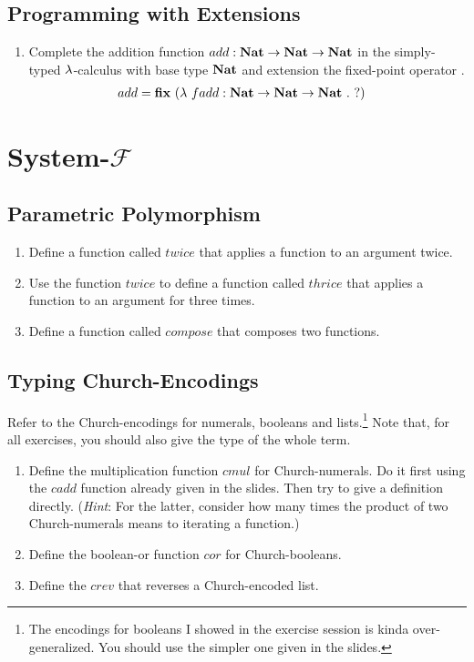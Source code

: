 \documentclass[a4paper,12pt]{article}
\begin{document}
\subsection{Programming with Extensions}

\begin{enumerate}
 \item Complete the addition function $add : \textbf{Nat} \rightarrow \textbf{Nat} \rightarrow \textbf{Nat}$ in the simply-typed
  $\lambda$-calculus with base type $\textbf{Nat}$ and extension the fixed-point operator \fixp.
  \begin{align*}
   add = \fixp\ (& \lamb\ fadd : \NatT \rarr \NatT \rarr \NatT\ .\ ?)
  \end{align*}
\end{enumerate}

\section{System-$\mathcal{F}$}

\subsection{Parametric Polymorphism}

\begin{enumerate}
 \item Define a function called $twice$ that applies a function to an argument twice.
 \item Use the function $twice$ to define a function called $thrice$ that applies a
  function to an argument for three times.
 \item Define a function called $compose$ that composes two functions.
\end{enumerate}

\subsection{Typing Church-Encodings}

Refer to the Church-encodings for numerals, booleans and lists.\footnote{The encodings
for booleans I showed in the exercise session is kinda over-generalized.  You should
use the simpler one given in the slides.}  Note that, for all exercises, you should also
give the type of the whole term.

\begin{enumerate}
 \item Define the multiplication function $cmul$ for Church-numerals.  Do it first using
 the $cadd$ function already given in the slides.  Then try to give a definition directly.
 (\emph{Hint}: For the latter, consider how many times the product of two Church-numerals
 means to iterating a function.)
 \item Define the boolean-or function $cor$ for Church-booleans.
 \item Define the $crev$ that reverses a Church-encoded list.
\end{enumerate}
\end{document}
